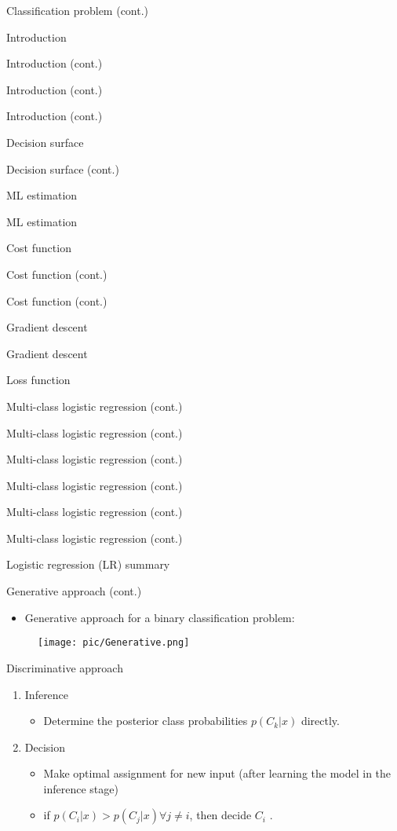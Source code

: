 \documentclass[serif, aspectratio=169]{beamer}
\begin{document}
\begin{frame}{Classification problem (cont.)}
\begin{itemize}
\begin{frame}{Introduction}
\begin{itemize}
\begin{frame}{Introduction (cont.)}
\begin{frame}{Introduction (cont.)}
\begin{frame}{Introduction (cont.)}
\begin{frame}{Decision surface}
\begin{itemize}
\begin{frame}{Decision surface (cont.)}
\begin{frame}{ML estimation}
\begin{frame}{ML estimation}
\begin{itemize}
\begin{frame}{Cost function}
\begin{frame}{Cost function (cont.)}
\begin{itemize}
\begin{itemize}
\begin{frame}{Cost function (cont.)}
\begin{frame}{Gradient descent}
\begin{frame}{Gradient descent}
\begin{frame}{Loss function}
\begin{frame}{Multi-class logistic regression (cont.)}
\begin{frame}{Multi-class logistic regression (cont.)}
\begin{frame}{Multi-class logistic regression (cont.)}
\begin{frame}{Multi-class logistic regression (cont.)}
\begin{frame}{Multi-class logistic regression (cont.)}
\begin{frame}{Multi-class logistic regression (cont.)}
\begin{frame}{Logistic regression (LR) summary}
\begin{itemize}
\begin{frame}{Generative approach (cont.)}
    \begin{itemize}
        \item Generative approach for a binary classification problem:
    \end{itemize}
    \begin{figure}[h]
      \centering
      \texttt{[image: pic/Generative.png]}
      \end{figure}
    \vfill
\end{frame}
\begin{frame}{Discriminative approach}
    \begin{enumerate}
        \item Inference
        \begin{itemize}
            \item Determine the posterior class probabilities $p(C_k|x)$ directly.
        \end{itemize}
        \item Decision
        \begin{itemize}
            \item Make optimal assignment for new input (after learning the model in the inference stage)
            \item if $p(C_i|x) > p(C_j|x) \forall j \neq i$, then decide $C_i$ .
        \end{itemize}
    \end{enumerate}
\end{frame}

\end{itemize}
\end{frame}
\end{frame}
\end{frame}
\end{frame}
\end{frame}
\end{frame}
\end{frame}
\end{frame}
\end{frame}
\end{frame}
\end{frame}
\end{itemize}
\end{itemize}
\end{frame}
\end{frame}
\end{itemize}
\end{frame}
\end{frame}
\end{frame}
\end{itemize}
\end{frame}
\end{frame}
\end{frame}
\end{frame}
\end{itemize}
\end{frame}
\end{itemize}
\end{frame}
\end{document}
